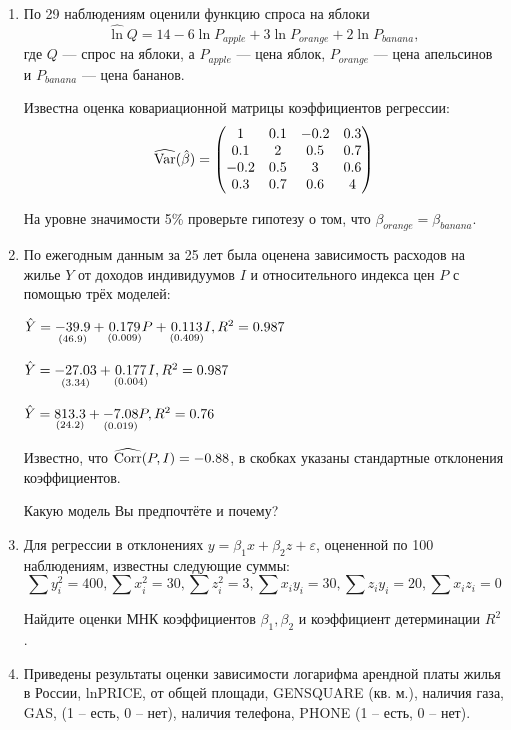 \begin{enumerate}

\item По 29 наблюдениям оценили функцию спроса на яблоки
\[
\widehat\ln Q = 14 -6 \ln P_{apple} + 3 \ln P_{orange} + 2 \ln P_{banana},
\]
где $Q$ — спрос на яблоки, а $P_{apple}$ — цена яблок, $P_{orange}$ — цена апельсинов и $P_{banana}$ — цена бананов.

Известна оценка ковариационной матрицы коэффициентов регрессии:
\[
\widehat{\operatorname{Var}}(\hat{\beta}) =
\begin{pmatrix}
1 & 0.1 & -0.2 & 0.3 \\
0.1 & 2 & 0.5 & 0.7 \\
-0.2 & 0.5 & 3 & 0.6 \\
0.3 & 0.7 & 0.6 &  4
\end{pmatrix}
\]

На уровне значимости 5\% проверьте гипотезу о том, что
$\beta_{orange}=\beta_{banana}$.


\item По ежегодным данным за 25 лет была оценена зависимость расходов на жилье $Y$ от доходов индивидуумов $I$ и относительного индекса цен $P$ с помощью трёх моделей:

$\hat{Y} = \underset{(46.9)}{-39.9} + \underset{(0.009)}{0.179} P + \underset{(0.409)}{0.113} I, R^2 = 0.987$

$\hat{Y} = \underset{(3.34)}{-27.03} + \underset{(0.004)}{0.177} I, R^2 = 0.987$

$\hat{Y} = \underset{(24.2)}{813.3} + \underset{(0.019)}{-7.08} P, R^2 = 0.76$

Известно, что $\widehat{\operatorname{Corr}} (P, I) = -0.88$, в скобках указаны стандартные отклонения коэффициентов.

Какую модель Вы предпочтёте и почему?


\item Для регрессии в отклонениях $y = \beta_1 x + \beta_2 z + \varepsilon$, оцененной по 100 наблюдениям, известны следующие суммы:
\[
\sum y^2_i = 400, \sum x_i^2 = 30, \sum z_i^2 = 3, \sum x_i y_i = 30, \sum z_i y_i = 20, \sum x_i z_i = 0
\]

Найдите оценки МНК коэффициентов $\beta_1, \beta_2$ и коэффициент детерминации $R^2$.


\item Приведены результаты оценки зависимости логарифма арендной платы жилья в России, lnPRICE, от общей площади,  GENSQUARE (кв. м.), наличия газа, GAS, (1 – есть, 0 – нет), наличия телефона, PHONE (1 – есть, 0 – нет).


\end{enumerate}
